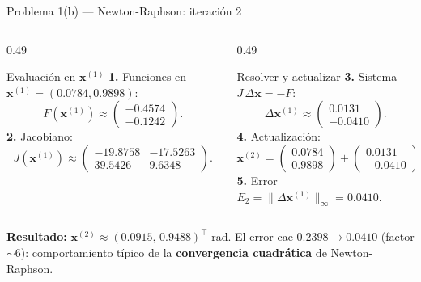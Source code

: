 \documentclass[aspectratio=169,10pt]{beamer}
\begin{document}
\begin{frame}{Problema 1(b) — Newton-Raphson: iteración 2}
\begin{columns}[T]
\begin{column}{0.49\textwidth}
\begin{cardgear}{Evaluación en $\mathbf x^{(1)}$}{\faCalculator}
{\footnotesize
\textbf{1.} Funciones en $\mathbf x^{(1)}=(0.0784,0.9898)$:
\[
F(\mathbf x^{(1)})\approx\begin{pmatrix}-0.4574\\ -0.1242\end{pmatrix}.
\]
\textbf{2.} Jacobiano:
\[
J(\mathbf x^{(1)})\approx\begin{pmatrix}-19.8758 & -17.5263\\ 39.5426 & 9.6348\end{pmatrix}.
\]}
\end{cardgear}
\end{column}
\begin{column}{0.49\textwidth}
\begin{cardgear}{Resolver y actualizar}{\faArrowRight}
{\footnotesize
\textbf{3.} Sistema $J\,\Delta\mathbf x=-F$:
\[
\Delta\mathbf x^{(1)}\approx\begin{pmatrix}0.0131\\ -0.0410\end{pmatrix}.
\]
\textbf{4.} Actualización:
\[
\mathbf x^{(2)}=\begin{pmatrix}0.0784\\0.9898\end{pmatrix}+\begin{pmatrix}0.0131\\-0.0410\end{pmatrix}=\begin{pmatrix}0.0915\\0.9488\end{pmatrix}.
\]
\textbf{5.} Error $E_2=\lVert\Delta\mathbf x^{(1)}\rVert_\infty=0.0410$.}
\end{cardgear}
\end{column}
\end{columns}
\vspace{1.5mm}
\begin{cardnota}[\faChartLine]
{\footnotesize \textbf{Resultado:} $\mathbf x^{(2)}\approx(0.0915,\,0.9488)^{\!\top}$ rad. El error cae $0.2398\to0.0410$ (factor $\sim6$): comportamiento típico de la \textbf{convergencia cuadrática} de Newton-Raphson.}
\end{cardnota}
\end{frame}
\end{document}
